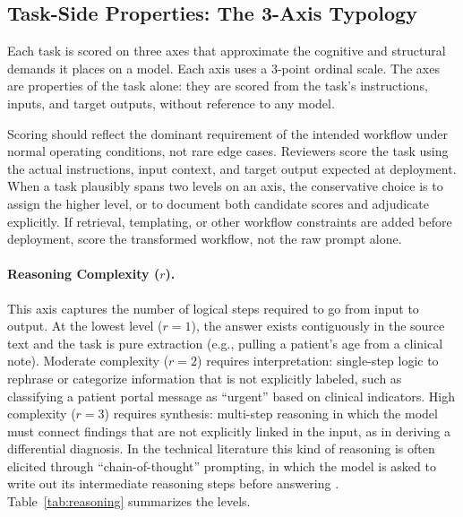 \documentclass[11pt]{article}
\begin{document}
\subsection{Task-Side Properties: The 3-Axis Typology}

Each task is scored on three axes that approximate the cognitive and structural demands it places on a model. Each axis uses a 3-point ordinal scale. The axes are properties of the task alone: they are scored from the task's instructions, inputs, and target outputs, without reference to any model.

Scoring should reflect the dominant requirement of the intended workflow under normal operating conditions, not rare edge cases. Reviewers score the task using the actual instructions, input context, and target output expected at deployment. When a task plausibly spans two levels on an axis, the conservative choice is to assign the higher level, or to document both candidate scores and adjudicate explicitly. If retrieval, templating, or other workflow constraints are added before deployment, score the transformed workflow, not the raw prompt alone.

\paragraph{Reasoning Complexity ($r$).}
This axis captures the number of logical steps required to go from input to output. At the lowest level ($r=1$), the answer exists contiguously in the source text and the task is pure extraction (e.g., pulling a patient's age from a clinical note). Moderate complexity ($r=2$) requires interpretation: single-step logic to rephrase or categorize information that is not explicitly labeled, such as classifying a patient portal message as ``urgent'' based on clinical indicators. High complexity ($r=3$) requires synthesis: multi-step reasoning in which the model must connect findings that are not explicitly linked in the input, as in deriving a differential diagnosis. In the technical literature this kind of reasoning is often elicited through ``chain-of-thought'' prompting, in which the model is asked to write out its intermediate reasoning steps before answering \cite{Wei2022, Lievin2024}. Table~\ref{tab:reasoning} summarizes the levels.
\end{document}
